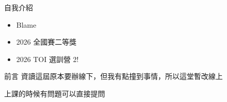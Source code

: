 \begin{frame}{自我介紹}
    \begin{itemize}
        \item Blame
        \item 2026 全國賽二等獎
        \item 2026 TOI 選訓營 2!
    \end{itemize}
\end{frame}

\begin{frame}{前言}
    資讀這屆原本要辦線下，但我有點撞到事情，所以這堂暫改線上\pause

    上課的時候有問題可以直接提問
\end{frame}